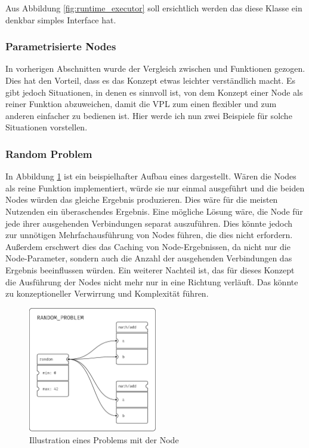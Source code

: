 \documentclass[ngerman]{article}
\begin{document}
Aus Abbildung \ref{fig:runtime_executor} soll ersichtlich werden das diese Klasse ein denkbar simples Interface hat. 

\subsubsection{Parametrisierte Nodes}
\label{sec:parameter_nodes}
In vorherigen Abschnitten wurde der Vergleich zwischen  und Funktionen gezogen. Dies hat den Vorteil, dass es das Konzept etwas leichter verständlich macht.
Es gibt jedoch Situationen, in denen es sinnvoll ist, von dem Konzept einer Node als reiner Funktion abzuweichen, damit die VPL zum einen flexibler und zum anderen einfacher zu bedienen ist. Hier werde ich nun zwei Beispiele für solche Situationen vorstellen.
\subsubsection*{Random Problem}
In Abbildung \ref{fig:random_problem} ist ein beispielhafter Aufbau eines  dargestellt. Wären die  Nodes als reine Funktion implementiert, würde sie nur einmal ausgeführt und die beiden  Nodes würden das gleiche Ergebnis produzieren. Dies wäre für die meisten Nutzenden ein überaschendes Ergebnis.
\br
Eine mögliche Lösung wäre, die  Node für jede ihrer ausgehenden Verbindungen separat auszuführen. 
Dies könnte jedoch zur unnötigen Mehrfachausführung von Nodes führen, die dies nicht erfordern.
Außerdem erschwert dies das Caching von Node-Ergebnissen, da nicht nur die Node-Parameter, sondern auch die Anzahl der ausgehenden Verbindungen das Ergebnis beeinflussen würden.
\br
Ein weiterer Nachteil ist, das für dieses Konzept die Ausführung der Nodes nicht mehr nur in eine Richtung verläuft. Das könnte zu konzeptioneller Verwirrung und Komplexität führen.
\br
\begin{figure}[htbp]
  \centering
  \includegraphics[width=0.5\textwidth]{graphics/RANDOM_PROBLEM.pdf}
  \caption{Illustration eines Problems mit der  Node}
  \label{fig:random_problem}
\end{figure}
\end{document}

